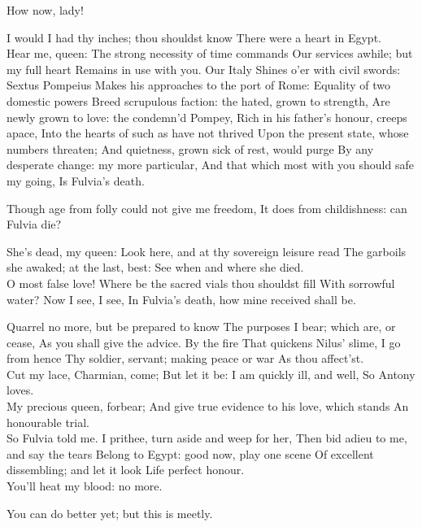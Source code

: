 \documentclass{book}
\begin{document}
\1	How now, lady!

\2	I would I had thy inches; thou shouldst know
	There were a heart in Egypt. \\

\1	Hear me, queen:
	The strong necessity of time commands
	Our services awhile; but my full heart
	Remains in use with you. Our Italy
	Shines o'er with civil swords: Sextus Pompeius
	Makes his approaches to the port of Rome:
	Equality of two domestic powers
	Breed scrupulous faction: the hated, grown to strength,
	Are newly grown to love: the condemn'd Pompey,
	Rich in his father's honour, creeps apace,
	Into the hearts of such as have not thrived
	Upon the present state, whose numbers threaten;
	And quietness, grown sick of rest, would purge
	By any desperate change: my more particular,
	And that which most with you should safe my going,
	Is Fulvia's death.

\2	Though age from folly could not give me freedom,
	It does from childishness: can Fulvia die?

\1	She's dead, my queen:
	Look here, and at thy sovereign leisure read
	The garboils she awaked; at the last, best:
	See when and where she died. \\

\2	O most false love!
	Where be the sacred vials thou shouldst fill
	With sorrowful water? Now I see, I see,
	In Fulvia's death, how mine received shall be.

\1	Quarrel no more, but be prepared to know
	The purposes I bear; which are, or cease,
	As you shall give the advice. By the fire
	That quickens Nilus' slime, I go from hence
	Thy soldier, servant; making peace or war
	As thou affect'st. \\

\2	                  Cut my lace, Charmian, come;
	But let it be: I am quickly ill, and well,
	So Antony loves. \\

\1	                  My precious queen, forbear;
	And give true evidence to his love, which stands
	An honourable trial. \\

\2	So Fulvia told me.
	I prithee, turn aside and weep for her,
	Then bid adieu to me, and say the tears
	Belong to Egypt: good now, play one scene
	Of excellent dissembling; and let it look
	Life perfect honour. \\

\1	You'll heat my blood: no more.

\2	You can do better yet; but this is meetly.
\end{document}
